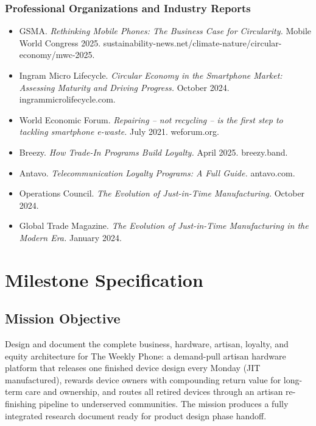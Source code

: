 \documentclass[11pt,letterpaper]{article}
\newcommand{\stageheader}[2]{%
  \noindent\colorbox{#2}{\makebox[\textwidth][l]{%
    \textcolor{white}{\bfseries\sffamily\hspace{6pt}#1\hspace{6pt}}}}%
  \vspace{0.5em}\par%
}
\begin{document}
\subsubsection{Professional Organizations and Industry Reports}
\begin{itemize}[noitemsep]
  \item GSMA. \textit{Rethinking Mobile Phones: The Business Case for Circularity.} Mobile World Congress 2025. sustainability-news.net/climate-nature/circular-economy/mwc-2025.
  \item Ingram Micro Lifecycle. \textit{Circular Economy in the Smartphone Market: Assessing Maturity and Driving Progress.} October 2024. ingrammicrolifecycle.com.
  \item World Economic Forum. \textit{Repairing -- not recycling -- is the first step to tackling smartphone e-waste.} July 2021. weforum.org.
  \item Breezy. \textit{How Trade-In Programs Build Loyalty.} April 2025. breezy.band.
  \item Antavo. \textit{Telecommunication Loyalty Programs: A Full Guide.} antavo.com.
  \item Operations Council. \textit{The Evolution of Just-in-Time Manufacturing.} October 2024.
  \item Global Trade Magazine. \textit{The Evolution of Just-in-Time Manufacturing in the Modern Era.} January 2024.
\end{itemize}

\newpage

\stageheader{STAGE 3 --- MISSION PACKAGE}{tertiary}

\section{Milestone Specification}

\subsection{Mission Objective}

Design and document the complete business, hardware, artisan, loyalty, and equity architecture for The Weekly Phone: a demand-pull artisan hardware platform that releases one finished device design every Monday (JIT manufactured), rewards device owners with compounding return value for long-term care and ownership, and routes all retired devices through an artisan re-finishing pipeline to underserved communities. The mission produces a fully integrated research document ready for product design phase handoff.
\end{document}
